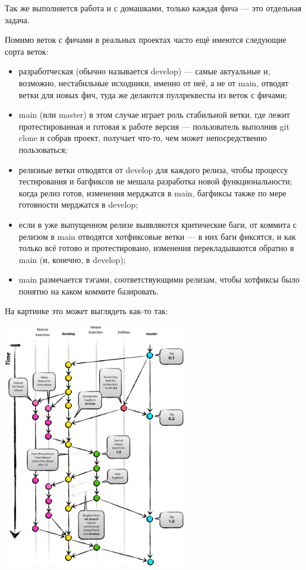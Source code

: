 \documentclass{../../text-style}
\begin{document}
Так же выполняется работа и с домашками, только каждая фича --- это отдельная задача.

Помимо веток с фичами в реальных проектах часто ещё имеются следующие сорта веток:

\begin{itemize}
    \item разработческая (обычно называется develop) --- самые актуальные и, возможно, нестабильные исходники, именно от неё, а не от main, отводят ветки для новых фич, туда же делаются пуллреквесты из веток с фичами;
    \item main (или master) в этом случае играет роль стабильной ветки, где лежит протестированная и готовая к работе версия --- пользователь выполнив git clone и собрав проект, получает что-то, чем может непосредственно пользоваться;
    \item релизные ветки отводятся от develop для каждого релиза, чтобы процессу тестирования и багфиксов не мешала разработка новой функциональности; когда релиз готов, изменения мерджатся в main, багфиксы также по мере готовности мерджатся в develop;
    \item если в уже выпущенном релизе выявляются критические баги, от коммита с релизом в main отводятся хотфиксовые ветки --- в них баги фиксятся, и как только всё готово и протестировано, изменения перекладываются обратно в main (и, конечно, в develop);
    \item main размечается тэгами, соответствующими релизам, чтобы хотфиксы было понятно на каком коммите базировать.
\end{itemize}

На картинке это может выглядеть как-то так:

\begin{center}
    \includegraphics[width=0.6\textwidth]{gitFlow.png}
\end{center}
\end{document}
